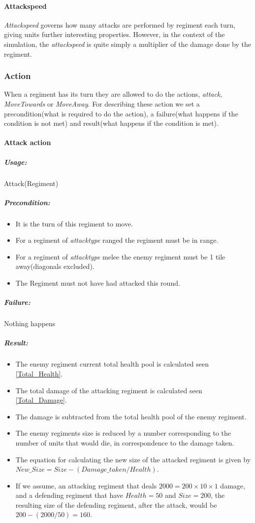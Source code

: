 		\paragraph{Attackspeed}
		\textit{Attackspeed} governs how many attacks are performed by regiment each turn, giving units further interesting properties. 
		However, in the context of the simulation, the \textit{attackspeed} is quite simply a multiplier of the damage done by the regiment.
		
		\subsubsection{Action}
		\label{rules:action}
		When a regiment has its turn they are allowed to do the actions, \textit{attack}, \textit{MoveTowards} or \textit{MoveAway}.
		For describing these action we set a precondition(what is required to do the action), a failure(what happens if the condition is not met)
		and result(what happens if the condition is met).
		
		\paragraph{Attack action}
		\subparagraph{Usage:} 
		Attack(Regiment)
		
		\subparagraph{Precondition:} 
		\begin{itemize}\itemsep0.0001cm
		\item It is the turn of this regiment to move.
		\item For a regiment of \textit{attacktype} ranged the regiment must be in range. 
		\item For a regiment of \textit{attacktype} melee the enemy regiment must be 1 tile away(diagonals excluded).
		\item The Regiment must not have had attacked this round.
		\end{itemize}
		\subparagraph{Failure:} 
		Nothing happens
		
		\subparagraph{Result:}
		\begin{itemize} 
		\item The enemy regiment current total health pool is calculated seen \ref{Total_Health}.
		\item The total damage of the attacking regiment is calculated seen \ref{Total_Damage}.
		\item The damage is subtracted from the total health pool of the enemy regiment.
		\item The enemy regiments size is reduced by a number corresponding to the number of units that would die, in correspondence to the damage taken.
		\item The equation for calculating the new size of the attacked regiment is given by 
		\subitem \label{New_Size}$New\_Size = Size - (Damage\_taken / Health)$.
		\item If we assume, an attacking regiment that deals $2000 = 200 \times 10 \times 1$ damage, and a defending regiment that have $Health = 50$ and $Size = 200$, the resulting size of the defending regiment, after the attack, would be $200-(2000/50)=160$.
		\end{itemize}
